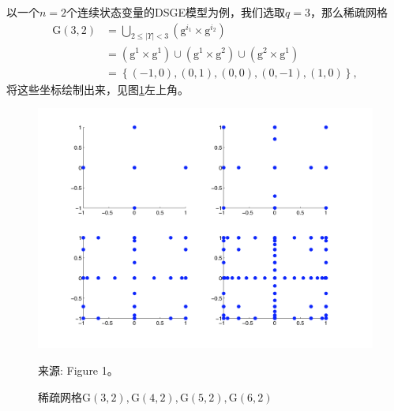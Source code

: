 以一个$n=2$个连续状态变量的DSGE模型为例，我们选取$q=3$，那么稀疏网格
\begin{equation*}
  \begin{split}
    \mathrm{G} \left( 3, 2 \right)
    & = \bigcup_{2 \le \left| \Upsilon \right| < 3} \left( \mathrm{g}^{i_1} \times \mathrm{g}^{i_2} \right) \\
    & = \left( \mathrm{g}^{1} \times \mathrm{g}^{1} \right)
    \cup
    \left( \mathrm{g}^{1} \times \mathrm{g}^{2} \right)
    \cup
    \left( \mathrm{g}^{2} \times \mathrm{g}^{1} \right) \\
    & = \left\{ (-1,0), (0,1), (0,0), (0,-1), (1,0) \right\},
  \end{split}
\end{equation*}
将这些坐标绘制出来，见图\ref{fig:pj-sparse-grid-example}左上角。

\begin{figure}[htbp]
   \caption[稀疏网格]{稀疏网格$\mathrm{G}(3,2),\mathrm{G}(4,2),\mathrm{G}(5,2),\mathrm{G}(6,2)$}
  \centering
  \includegraphics[width=12cm]{./Figures/20180325-sparse-grid-example}
  \label{fig:pj-sparse-grid-example}

  \small{来源: \cite{Krueger:2004gh} Figure 1。}
\end{figure}

